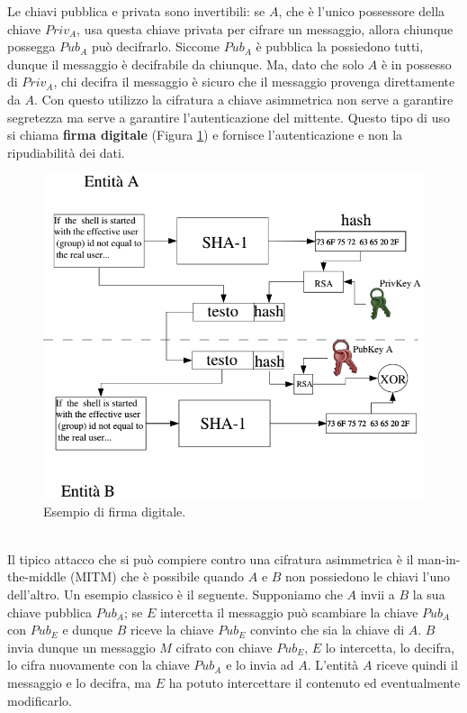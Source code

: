 Le chiavi pubblica e privata sono invertibili: se $A$, che è l'unico possessore della chiave $Priv_A$, usa questa chiave privata per cifrare un messaggio, allora chiunque possegga $Pub_A$ può decifrarlo. Siccome $Pub_A$ è pubblica la possiedono tutti, dunque il messaggio è decifrabile da chiunque. Ma, dato che solo $A$ è in possesso di $Priv_A$, chi decifra il messaggio è sicuro che il messaggio provenga direttamente da $A$. Con questo utilizzo la cifratura a chiave asimmetrica non serve a garantire segretezza ma serve a garantire l'autenticazione del mittente. Questo tipo di uso si chiama \textbf{firma digitale} (Figura \ref{img:digital_signature}) e fornisce l'autenticazione e non la ripudiabilità dei dati.
\begin{figure}[htbp]
	\centering
	\includegraphics[scale = 0.5]{images/digital_signature}
	\caption{Esempio di firma digitale.}
	\label{img:digital_signature}
\end{figure}\\
Il tipico attacco che si può compiere contro una cifratura asimmetrica è il man-in-the-middle (MITM) che è possibile quando $A$ e $B$ non possiedono le chiavi l'uno dell'altro. Un esempio classico è il seguente. Supponiamo che $A$ invii a $B$ la sua chiave pubblica $Pub_A$; se $E$ intercetta il messaggio può scambiare la chiave $Pub_A$ con $Pub_E$ e dunque $B$ riceve la chiave $Pub_E$ convinto che sia la chiave di $A$. $B$ invia dunque un messaggio $M$ cifrato con chiave $Pub_E$, $E$ lo intercetta, lo decifra, lo cifra nuovamente con la chiave $Pub_A$ e lo invia ad $A$. L'entità $A$ riceve quindi il messaggio e lo decifra, ma $E$ ha potuto intercettare il contenuto ed eventualmente modificarlo.

